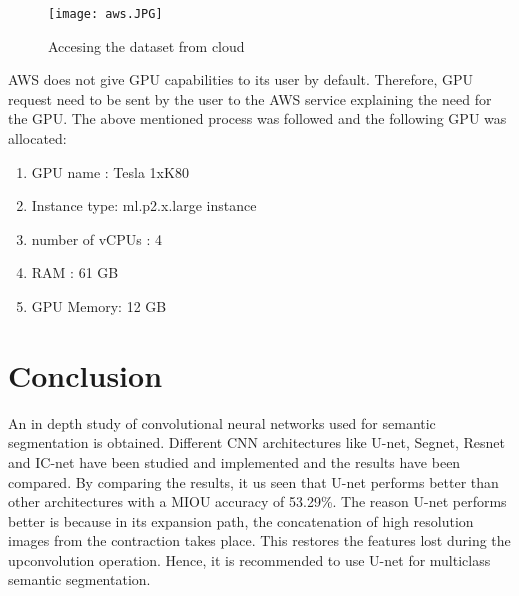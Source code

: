 \documentclass{IEEEtran}
\begin{document}
\begin{figure}[h]
    \centering
    \captionsetup{justification=centering}
    \texttt{[image: aws.JPG]}
    \caption{Accesing the dataset from cloud}
    \label{fig:Binary class segmented output}
\end{figure}

AWS does not give GPU capabilities to its user by default. Therefore, GPU request need to be sent by the user to the AWS service explaining the need for the GPU. The above mentioned process was followed and the following GPU was allocated:
\begin{enumerate}
    \item GPU name : Tesla 1xK80
    \item Instance type: ml.p2.x.large instance
    \item number of vCPUs : 4
    \item RAM : 61 GB
    \item GPU Memory: 12 GB
\end{enumerate}

\section{\textbf{Conclusion}}
An in depth study of convolutional neural networks used for semantic segmentation is obtained. Different CNN architectures like U-net, Segnet, Resnet and IC-net have been studied and implemented and the results have been compared. By comparing the results, it us seen that U-net performs better than other architectures with a MIOU accuracy of 53.29\%. The reason U-net performs better is because in its expansion path, the concatenation of high resolution images from the contraction takes place. This restores the features lost during the upconvolution operation. Hence, it is recommended to use U-net for multiclass semantic segmentation.
\end{document}
